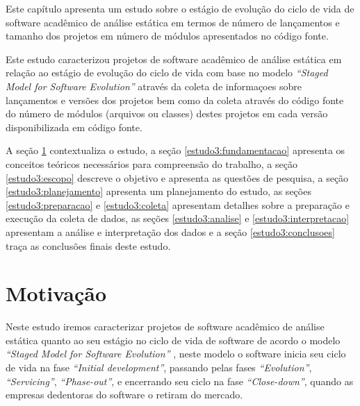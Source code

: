 \label{estudo3}



Este capítulo apresenta um estudo sobre o estágio de evolução do ciclo de vida
de software acadêmico de análise estática em termos de número de lançamentos e
tamanho dos projetos em número de módulos apresentados no código fonte.

Este estudo caracterizou projetos de software acadêmico de análise estática em
relação ao estágio de evolução do ciclo de vida com base no modelo {\it
``Staged Model for Software Evolution''} através da coleta de informaçoes sobre
lançamentos e versões dos projetos bem como da coleta através do código fonte
do número de módulos (arquivos ou classes) destes projetos em cada versão
disponibilizada em código fonte.

A seção \ref{estudo3:introducao} contextualiza o estudo,
a seção \ref{estudo3:fundamentacao} apresenta os conceitos teóricos necessários para compreensão do trabalho,
a seção \ref{estudo3:escopo} descreve o objetivo e apresenta as questões de pesquisa,
a seção \ref{estudo3:planejamento} apresenta um planejamento do estudo,
as seções \ref{estudo3:preparacao} e \ref{estudo3:coleta} apresentam detalhes sobre a preparação e execução da coleta de dados,
as seções \ref{estudo3:analise} e \ref{estudo3:interpretacao} apresentam a análise e interpretação dos dados e
a seção \ref{estudo3:conclusoes} traça as conclusões finais deste estudo.

\section{Motivação} \label{estudo3:introducao}

Neste estudo iremos caracterizar projetos de software acadêmico de análise
estática quanto ao seu estágio no ciclo de vida de software de acordo o modelo
{\it ``Staged Model for Software Evolution''}
\cite{rajlich2000staged}, neste modelo o software inicia seu ciclo de
vida na fase {\it ``Initial development''}, passando pelas fases {\it
``Evolution''}, {\it ``Servicing''}, {\it ``Phase-out''}, e encerrando seu ciclo
na fase {\it ``Close-down''}, quando as empresas dedentoras do
software o retiram do mercado.

